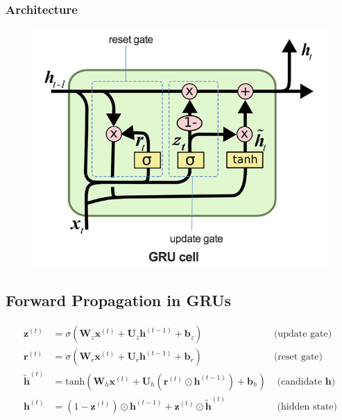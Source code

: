 \subsubsection*{Architecture}
\begin{figure}[H]
  \centering
  \includegraphics[width=0.7\linewidth]{images/gru.png}
\end{figure}

\subsection*{Forward Propagation in GRUs}
\begin{align*}
  \mathbf{z}^{(t)} &= \sigma(\mathbf{W}_z \mathbf{x}^{(t)} + \mathbf{U}_z \mathbf{h}^{(t-1)} + \mathbf{b}_z) & \text{(update gate)} \\
  \mathbf{r}^{(t)} &= \sigma(\mathbf{W}_r \mathbf{x}^{(t)} + \mathbf{U}_r \mathbf{h}^{(t-1)} + \mathbf{b}_r) & \text{(reset gate)} \\
  \tilde{\mathbf{h}}^{(t)} &= \text{tanh}(\mathbf{W}_h \mathbf{x}^{(t)} + \mathbf{U}_h (\mathbf{r}^{(t)} \odot \mathbf{h}^{(t-1)}) + \mathbf{b}_h) &\text{ (candidate $\mathbf{h}$)} \\
  \mathbf{h}^{(t)} &= (1 - \mathbf{z}^{(t)}) \odot \mathbf{h}^{(t-1)} + \mathbf{z}^{(t)} \odot \tilde{\mathbf{h}}^{(t)} &\text{ (hidden state)}
\end{align*}
